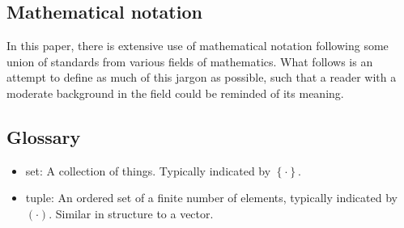 \documentclass{article}
\newcommand{\braces}[1]{\ensuremath{\left\lbrace #1 \right\rbrace}}
\newcommand{\angles}[1]{\ensuremath{\left\langle #1 \right\rangle}}
\newcommand{\parens}[1]{\ensuremath{\left( #1 \right)}}
\newcommand{\integers}{\ensuremath{\mathbb{Z}}}
\newcommand{\wholes}{\ensuremath{\mathbb{N}}}
\newcommand{\reals}{\ensuremath{\mathbb{R}}}
\renewcommand{\vec}{\boldsymbol}
\newcommand{\abs}[1]{\ensuremath{\left|#1\right|}}
\begin{document}
\appendixpage
\begin{appendix}
\section{Mathematical notation}
\label{sec:notation}
In this paper, there is extensive use of mathematical notation following some union of standards from various fields of mathematics. What follows is an attempt to define as much of this jargon as possible, such that a reader with a moderate background in the field could be reminded of its meaning.


\subsection{Glossary}
\begin{itemize}
\item set: A collection of things. Typically indicated by \braces{\cdot}.
\item tuple: An ordered set of a finite number of elements, typically indicated by \parens{\cdot}. Similar in structure to a vector.
\end{itemize}


\end{appendix}
\end{document}
